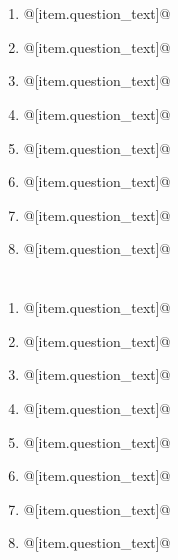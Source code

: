 \documentclass[uplatex,a4j,11pt]{jsarticle}
\begin{document}
\begin{minipage}[t][6cm][t]{\linewidth}
  \section{}
  \begin{multicols}{2}
  \begin{enumerate}
      \item @[item.question\_text]@
      \item @[item.question\_text]@
      \item @[item.question\_text]@
      \item @[item.question\_text]@
      \item @[item.question\_text]@
      \item @[item.question\_text]@
      \item @[item.question\_text]@
      \item @[item.question\_text]@
  \end{enumerate}
  \vfill
  \end{multicols}
\end{minipage}
\begin{minipage}[t][6cm][t]{\linewidth}
  \section{}
  \begin{multicols}{2}
  \begin{enumerate}
      \item @[item.question\_text]@
      \item @[item.question\_text]@
      \item @[item.question\_text]@
      \item @[item.question\_text]@
      \item @[item.question\_text]@
      \item @[item.question\_text]@
      \item @[item.question\_text]@
      \item @[item.question\_text]@
  \end{enumerate}
  \vfill
  \end{multicols}
\end{minipage}
\newpage
\end{document}
